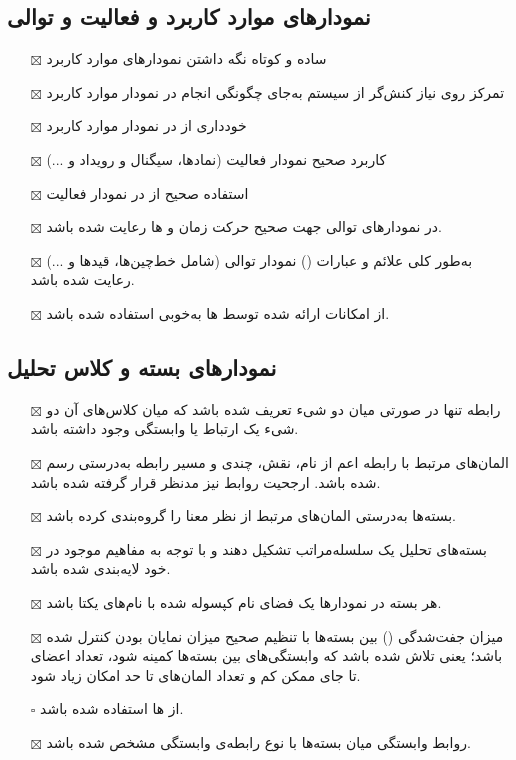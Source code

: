 \subsection{نمودارهای موارد کاربرد و فعالیت و توالی}

\begin{itemize}
	\item[$\boxtimes$]
	ساده و کوتاه نگه داشتن نمودارهای موارد کاربرد
	\item[$\boxtimes$]
	تمرکز روی نیاز کنش‌گر از سیستم به‌جای چگونگی انجام در نمودار موارد کاربرد
	\item[$\boxtimes$]
	خودداری از  در نمودار موارد کاربرد
	\item[$\boxtimes$]
	کاربرد صحیح  نمودار فعالیت (نمادها، سیگنال و رویداد و ...)
	\item[$\boxtimes$]
	استفاده صحیح از  در نمودار فعالیت
	\item[$\boxtimes$]
	در نمودارهای توالی جهت صحیح حرکت زمان و ها رعایت شده باشد.
	\item[$\boxtimes$]
	به‌طور کلی علائم و عبارات () نمودار توالی (شامل خط‌چین‌ها، قیدها و ...) رعایت شده باشد.
	\item[$\boxtimes$]
	از امکانات ارائه شده توسط ها به‌خوبی استفاده شده باشد.
	
\end{itemize}

\subsection{نمودارهای بسته و کلاس تحلیل}

\begin{itemize}
	\item[$\boxtimes$]
	رابطه  تنها در صورتی میان دو شیء تعریف شده باشد که میان کلاس‌های آن دو شیء یک ارتباط یا وابستگی وجود داشته باشد.
	\item[$\boxtimes$]
	المان‌های مرتبط با رابطه  اعم از نام، نقش، چندی و مسیر رابطه به‌درستی رسم شده باشد. ارجحیت روابط نیز مدنظر قرار گرفته شده باشد.
	\item[$\boxtimes$]
	بسته‌ها به‌درستی المان‌های مرتبط از نظر معنا را گروه‌بندی کرده باشد.
	\item[$\boxtimes$]
	بسته‌های تحلیل یک سلسله‌مراتب تشکیل دهند و با توجه به مفاهیم موجود در خود لایه‌بندی شده باشد.
	\item[$\boxtimes$]
	هر بسته در نمودارها یک فضای نام کپسوله شده با نام‌های یکتا باشد.
	\item[$\boxtimes$]
	میزان جفت‌شدگی () بین بسته‌ها با تنظیم صحیح میزان نمایان بودن کنترل شده باشد؛ یعنی تلاش شده باشد که وابستگی‌های بین بسته‌ها کمینه شود، تعداد اعضای  تا جای ممکن کم و تعداد المان‌های  تا حد امکان زیاد شود.
	\item[$\square$]
	از ها استفاده‌ شده باشد.
	\item[$\boxtimes$]
	روابط وابستگی میان بسته‌ها با نوع رابطه‌ی وابستگی مشخص شده باشد.

\end{itemize}

